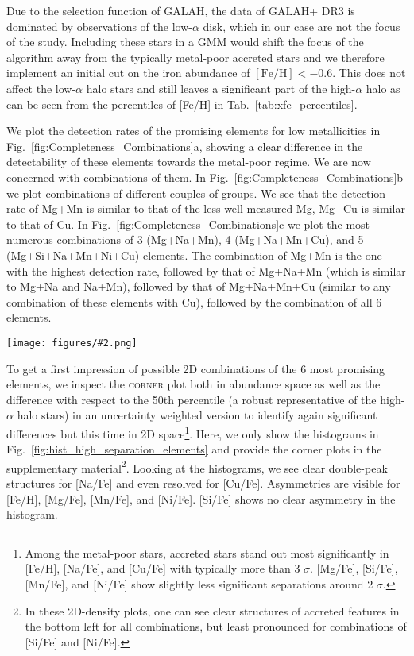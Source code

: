 \documentclass[fleqn,usenatbib]{mnras}
\newcommand{\codeicon}{{\faCloudDownload}}
\newcommand{\codelink}[1]{\href{https://github.com/svenbuder/buder_galah_accreted_chemistry/tree/main/figures/#1.ipynb}{\codeicon}\,\,}
\newcommand{\oscaption}[2]{\caption{#2 \codelink{#1}}}
\newcommand{\figuretextwidth}[4]{\begin{figure*} \centering \texttt{[image: figures/\#2.png]}\oscaption{#3}{#4}\label{fig:#2} \end{figure*}}
\begin{document}
Due to the selection function of GALAH, the data of GALAH+ DR3 is dominated by observations of the low-$\alpha$ disk, which in our case are not the focus of the study. Including these stars in a GMM would shift the focus of the algorithm away from the typically metal-poor accreted stars and we therefore implement an initial cut on the iron abundance of $\mathrm{[Fe/H] < -0.6}$. This does not affect the low-$\alpha$ halo stars and still leaves a significant part of the high-$\alpha$ halo as can be seen from the percentiles of [Fe/H] in Tab.~\ref{tab:xfe_percentiles}.

We plot the detection rates of the promising elements for low metallicities in Fig.~\ref{fig:Completeness_Combinations}a, showing a clear difference in the detectability of these elements towards the metal-poor regime. We are now concerned with combinations of them. In Fig.~\ref{fig:Completeness_Combinations}b we plot combinations of different couples of groups. We see that the detection rate of Mg+Mn is similar to that of the less well measured Mg, Mg+Cu is similar to that of Cu. In Fig.~\ref{fig:Completeness_Combinations}c we plot the most numerous combinations of 3 (Mg+Na+Mn), 4 (Mg+Na+Mn+Cu), and 5 (Mg+Si+Na+Mn+Ni+Cu) elements. The combination of Mg+Mn is the one with the highest detection rate, followed by that of Mg+Na+Mn (which is similar to Mg+Na and Na+Mn), followed by that of Mg+Na+Mn+Cu (similar to any combination of these elements with Cu), followed by the combination of all 6 elements.

\figuretextwidth{17cm}{hist_high_separation_elements}{gaussian_mixture_models}{
\textbf{Histograms of [Fe/H], [Mg/Fe], [Si/Fe], [Na/Fe], [Mn/Fe], [Cu/Fe], and [Ni/Fe] for stars with $\mathrm{[Fe/H]} < -0.6$ which passed the basic quality cuts (Eq.~\ref{eq:basic_cuts})}.
Only stars with unflagged measurements for all these elements are shown. Extensive \textsc{corner} plots are provided in the supplementary material.
}

To get a first impression of possible 2D combinations of the 6 most promising elements, we inspect the \textsc{corner} plot \citep{corner} both in abundance space as well as the difference with respect to the 50th percentile (a robust representative of the high-$\alpha$ halo stars) in an uncertainty weighted version to identify again significant differences but this time in 2D space\footnote{Among the metal-poor stars, accreted stars stand out most significantly in [Fe/H], [Na/Fe], and [Cu/Fe] with typically more than 3 $\sigma$. [Mg/Fe], [Si/Fe], [Mn/Fe], and [Ni/Fe] show slightly less significant separations around 2 $\sigma$.}. Here, we only show the histograms in Fig.~\ref{fig:hist_high_separation_elements} and provide the corner plots in the supplementary material\footnote{In these 2D-density plots, one can see clear structures of accreted features in the bottom left for all combinations, but least pronounced for combinations of [Si/Fe] and [Ni/Fe].}. Looking at the histograms, we see clear double-peak structures for [Na/Fe] and even resolved for [Cu/Fe]. Asymmetries are visible for [Fe/H], [Mg/Fe], [Mn/Fe], and [Ni/Fe]. [Si/Fe] shows no clear asymmetry in the histogram.
\end{document}
